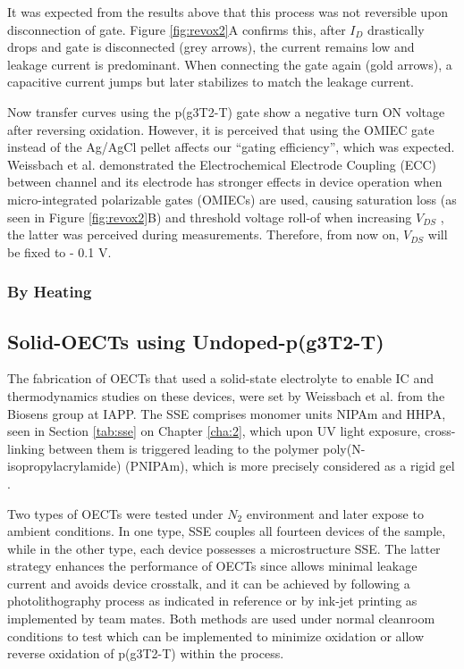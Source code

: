 It was expected from the results above that this process was not reversible upon disconnection of gate. Figure \ref{fig:revox2}A confirms this, after $I_{D}$ drastically drops and gate is disconnected (grey arrows), the current remains low and leakage current is predominant. When connecting the gate again (gold arrows), a capacitive current jumps but later stabilizes to match the leakage current.

Now transfer curves using the p(g3T2-T) gate show a negative turn ON voltage after reversing oxidation. However, it is perceived that using the OMIEC gate instead of the Ag/AgCl pellet affects our ``gating efficiency'', which was expected. Weissbach et al. demonstrated the Electrochemical Electrode Coupling (ECC) between channel and its electrode has stronger effects in device operation when micro-integrated polarizable gates (OMIECs) are used, causing saturation loss (as seen in Figure \ref{fig:revox2}B) and threshold voltage roll-of when increasing $V_{DS}$ \cite{weissbachUnravelingElectrochemicalElectrode2023}, the latter was perceived during measurements. Therefore, from now on, $V_{DS}$ will be fixed to - 0.1 V.

\subsubsection{By Heating}


\subsection{Solid-OECTs using Undoped-p(g3T2-T)}
The fabrication of OECTs that used a solid-state electrolyte to enable IC and thermodynamics studies on these devices, were set by Weissbach et al. from the Biosens group at IAPP. The SSE comprises monomer units NIPAm and HHPA, seen in Section \ref{tab:sse} on Chapter \ref{cha:2}, %
which upon UV light exposure, cross-linking between them is triggered leading to the polymer poly(N-isopropylacrylamide) (PNIPAm), which is more precisely considered as a rigid gel \cite{weissbachPhotopatternableSolidElectrolyte2022}. 

Two types of OECTs were tested under $N_{2}$ environment and later expose to ambient conditions. In one type, SSE couples all fourteen devices of the sample, while in the other type, each device possesses a microstructure SSE. The latter strategy enhances the performance of OECTs since allows minimal leakage current and avoids device crosstalk, and it can be achieved by following a photolithography process as indicated in reference \cite{weissbachPhotopatternableSolidElectrolyte2022} or by ink-jet printing as implemented by team mates. Both methods are used under normal cleanroom conditions to test which can be implemented to minimize oxidation or allow reverse oxidation of p(g3T2-T) within the process. 

